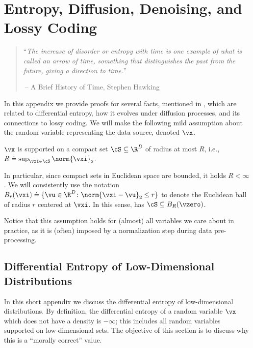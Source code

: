 \documentclass[../../book-main.tex]{subfiles}
\begin{document}
\chapter{Entropy, Diffusion, Denoising, and Lossy
Coding}\label{app:entropy}

\begin{quote}
    ``{\em The increase of disorder or entropy with time is one
        example of what is called an arrow of time, something that
    distinguishes the past from the future, giving a direction to time.}''

    $~$\hfill -- A Brief History of Time, Stephen Hawking
\end{quote}
\vspace{5mm}

In this appendix we provide proofs for several facts, mentioned in
, which are related to differential entropy, how
it evolves under diffusion processes, and its connections to lossy coding. We
will make the following mild assumption about the random variable representing
the data source, denoted \(\vx\).

\begin{assumption}\label{assumption:entropy_x_compact_support}
    \(\vx\) is supported on a compact set \(\cS \subseteq \R^{D}\) of
    radius at most \(R\), i.e., \(R \doteq \sup_{\vxi \in \cS}\norm{\vxi}_{2}\).
\end{assumption}

In particular, since compact sets in Euclidean space are bounded, it
holds \(R < \infty\). We will consistently use the notation
\(B_{r}(\vxi) \doteq \{\vu \in \R^{D} \colon \norm{\vxi - \vu}_{2}
\leq r\}\) to denote the Euclidean ball of radius \(r\) centered at
\(\vxi\). In this sense, 
has \(\cS \subseteq B_{R}(\vzero)\).

Notice that this assumption holds for (almost) all variables we care
about in practice, as it is (often) imposed by a normalization step
during data pre-processing.

\section{Differential Entropy of Low-Dimensional
Distributions}\label{sec:low_dim_entropy}

In this short appendix we discuss the differential entropy of
low-dimensional distributions. By definition, the differential
entropy of a random variable \(\vx\) which does not have a density
is \(-\infty\); this includes all random variables supported on
low-dimensional sets. The objective of this section is to discuss why
this is a ``morally correct'' value.
\end{document}
